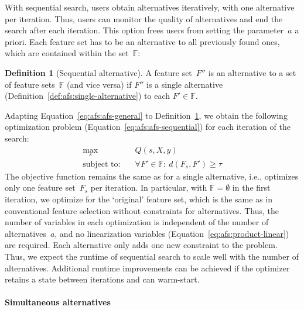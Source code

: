 \documentclass[iicol, sn-basic, Numbered]{sn-jnl} %
\theoremstyle{plain}
\theoremstyle{definition}
\newtheorem{definition}{Definition}
\begin{document}
With sequential search, users obtain alternatives iteratively, with one alternative per iteration.
Thus, users can monitor the quality of alternatives and end the search after each iteration.
This option frees users from setting the parameter~$a$ a priori.
Each feature set has to be an alternative to all previously found ones, which are contained within the set~$\mathbb{F}$:
%
\begin{definition}[Sequential alternative]
	A feature set~$F''$ is an alternative to a set of feature sets~$\mathbb{F}$ (and vice versa) if $F''$ is a single alternative (Definition~\ref{def:afs:single-alternative}) to each $F' \in \mathbb{F}$.
	\label{def:afs:sequential-alternative}
\end{definition}
%
Adapting Equation~\ref{eq:afs:afs-general} to Definition~\ref{def:afs:sequential-alternative}, we obtain the following optimization problem (Equation~\ref{eq:afs:afs-sequential}) for each iteration of the search:
%
\begin{equation}
	\begin{aligned}
		\max_s &\quad Q(s,X,y) \\
		\text{subject to:} &\quad \forall F' \in \mathbb{F}:~d(F_s,F') \geq \tau
	\end{aligned}
	\label{eq:afs:afs-sequential}
\end{equation}
%
The objective function remains the same as for a single alternative, i.e., optimizes only one feature set~$F_s$ per iteration.
In particular, with $\mathbb{F} = \emptyset$ in the first iteration, we optimize for the `original' feature set, which is the same as in conventional feature selection without constraints for alternatives.
Thus, the number of variables in each optimization is independent of the number of alternatives~$a$, and no linearization variables (Equation~\ref{eq:afs:product-linear}) are required.
Each alternative only adds one new constraint to the problem.
Thus, we expect the runtime of sequential search to scale well with the number of alternatives.
Additional runtime improvements can be achieved if the optimizer retains a state between iterations and can warm-start.

\paragraph{Simultaneous alternatives}
\end{document}
